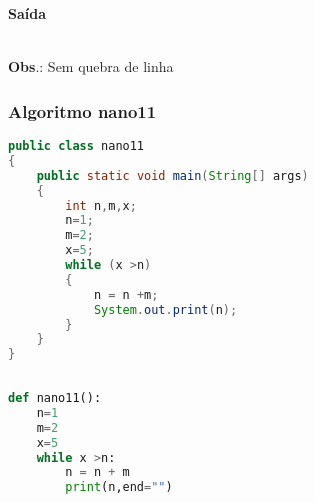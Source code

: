 \documentclass[hidelinks,12pt]{article}
\begin{document}
	{\large{\textbf{Saída}}}
	
	\noindent{}\\	
	
	\textbf{Obs}.: Sem quebra de linha\\
	
	\subsubsection{Algoritmo nano11}
	
	\begin{lstlisting}[caption=Código em Java,language=java]
public class nano11
{
	public static void main(String[] args)
	{
		int n,m,x;
		n=1;
		m=2;
		x=5;
		while (x >n)
		{
			n = n +m;
			System.out.print(n);
		}
	}
}	
	
	\end{lstlisting}
	
	\begin{lstlisting}[caption=Código em python,language=Python]
def nano11():
	n=1 
	m=2
	x=5
	while x >n:
		n = n + m
		print(n,end="")
	
	
	\end{lstlisting}
	
\end{document}
